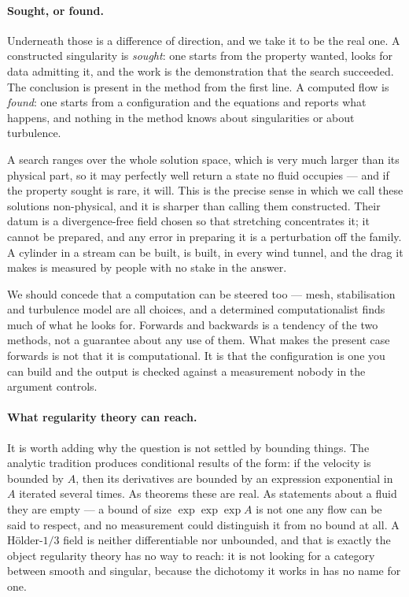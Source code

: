 \documentclass[11pt]{article}
\begin{document}
\paragraph{Sought, or found.} Underneath those is a difference of direction, and we take it to be
the real one. A constructed singularity is \emph{sought}: one starts from the property wanted, looks
for data admitting it, and the work is the demonstration that the search succeeded. The conclusion
is present in the method from the first line. A computed flow is \emph{found}: one starts from a
configuration and the equations and reports what happens, and nothing in the method knows about
singularities or about turbulence.

A search ranges over the whole solution space, which is very much larger than its physical part, so
it may perfectly well return a state no fluid occupies --- and if the property sought is rare, it
will. This is the precise sense in which we call these solutions non-physical, and it is sharper
than calling them constructed. Their datum is a divergence-free field chosen so that stretching
concentrates it; it cannot be prepared, and any error in preparing it is a perturbation off the
family. A cylinder in a stream can be built, is built, in every wind tunnel, and the drag it makes
is measured by people with no stake in the answer.

We should concede that a computation can be steered too --- mesh, stabilisation and turbulence model
are all choices, and a determined computationalist finds much of what he looks for. Forwards and
backwards is a tendency of the two methods, not a guarantee about any use of them. What makes the
present case forwards is not that it is computational. It is that the configuration is one you can
build and the output is checked against a measurement nobody in the argument controls.

\paragraph{What regularity theory can reach.} It is worth adding why the question is not settled
by bounding things. The analytic tradition produces conditional results of the form: if the velocity
is bounded by $A$, then its derivatives are bounded by an expression exponential in $A$ iterated
several times. As theorems these are real. As statements about a fluid they are empty --- a bound of
size $\exp\exp\exp A$ is not one any flow can be said to respect, and no measurement could
distinguish it from no bound at all. A H\"older-$1/3$ field is neither differentiable nor unbounded,
and that is exactly the object regularity theory has no way to reach: it is not looking for a
category between smooth and singular, because the dichotomy it works in has no name for one.
\end{document}
